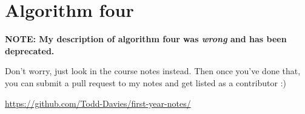\section{Algorithm four}

\textbf{NOTE: My description of algorithm four was \textit{wrong} and
  has been deprecated.}

Don't worry, just look in the course notes instead. Then once you've
done that, you can submit a pull request to my notes and get listed as
a contributor :)

\url{https://github.com/Todd-Davies/first-year-notes/}











